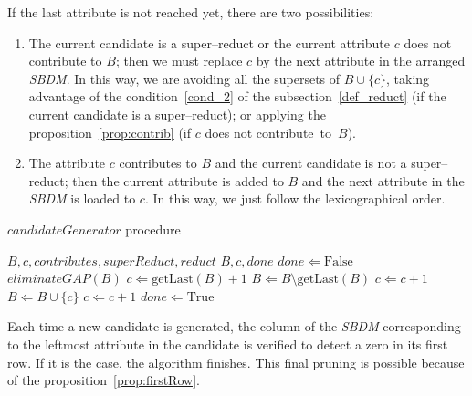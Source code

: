 \documentclass[number,preprint,review,12pt]{elsarticle}
\begin{document}
	If the last attribute is not reached yet, there are two possibilities:			
	\begin{enumerate}
		\item The current candidate is a super--reduct or the current attribute $c$ does not contribute to $B$; then we must replace $c$ by the next attribute in the arranged \textit{SBDM}. In this way, we are avoiding all the supersets of $B\cup\lbrace c\rbrace$, taking advantage of the condition~\ref{cond_2} of the subsection~\ref{def_reduct} (if the current candidate is a super--reduct); or applying the proposition~\ref{prop:contrib} (if $c$ does not contribute~to~$B$).
		
		\item The attribute $c$ contributes to $B$ and the current candidate is not a super--reduct; then the current attribute is added to $B$ and the next attribute in the \textit{SBDM} is loaded to $c$. In this way, we just follow the lexicographical order.
	\end{enumerate}  	
			
	\begin{algorithm}
		\footnotesize
		\caption{$candidateGenerator$ procedure}
		\label{alg:CandGenerator}
		\begin{algorithmic}[1]
			\Require \textit{$B,c,contributes,superReduct,reduct$}
			\Ensure $B,c,done$ 
			\State $done \Leftarrow \mathrm{False}$
			\label{line:cg} 
			\label{line:gap} 
			\State $eliminateGAP(B)$
			\EndIf
			\State $c \Leftarrow  \mathrm{getLast}(B)+1$
			\State $B \Leftarrow B\setminus \mathrm{getLast}(B)$\label{line:remLast}
			\Else
			\label{line:NCorSR}
			\State $c \Leftarrow c+1$\label{line:replaceC} 
			\Else
			\State $B \Leftarrow B\cup \lbrace c\rbrace$\label{line:add1} 
			\State $c \Leftarrow c+1$\label{line:add1End} 
			\EndIf
			\EndIf
			 \label{line:done}
			\State $done \Leftarrow \mathrm{True}$
			\EndIf
		\end{algorithmic}
	\end{algorithm}
	
	Each time a new candidate is generated, the column of the \textit{SBDM} corresponding to the leftmost attribute in the candidate is verified to detect a zero in its first row. If it is the case, the algorithm finishes. This final pruning is possible because of the proposition~\ref{prop:firstRow}.
	
\end{document}
